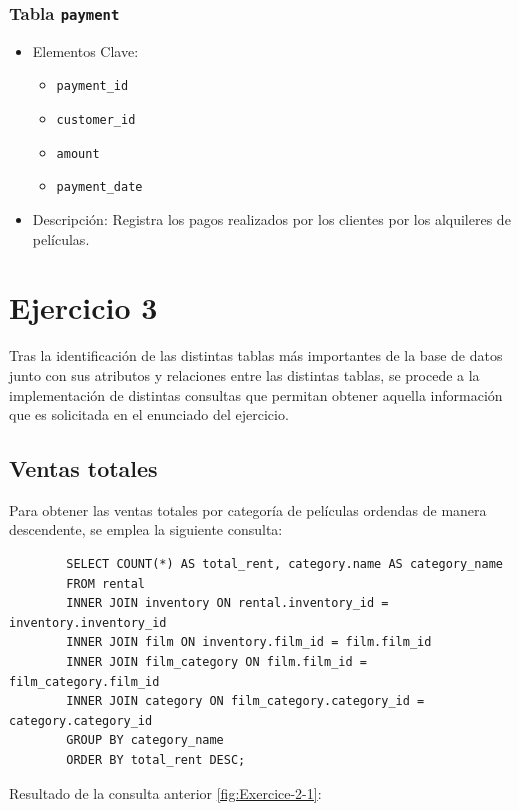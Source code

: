 \documentclass[11pt]{report}
\begin{document}
		\subsubsection{Tabla \texttt{payment}}
		\begin{itemize}
		  \item Elementos Clave:
		  \begin{itemize}
			\item \texttt{payment\_id}
			\item \texttt{customer\_id}
			\item \texttt{amount}
			\item \texttt{payment\_date}
		  \end{itemize}
		  \item Descripción: Registra los pagos realizados por los clientes por los alquileres de películas.
		\end{itemize}
	
	\section{Ejercicio 3}
	Tras la identificación de las distintas tablas más importantes de la base de datos junto con sus atributos  y relaciones entre las distintas tablas, se procede a la implementación de distintas consultas que permitan obtener aquella información que es solicitada en el enunciado del ejercicio.
\\
	\subsection{Ventas totales}
	Para obtener las ventas totales por categoría de películas ordendas de manera descendente, se emplea la siguiente consulta:

	\begin{verbatim}
		SELECT COUNT(*) AS total_rent, category.name AS category_name
		FROM rental
		INNER JOIN inventory ON rental.inventory_id = inventory.inventory_id
		INNER JOIN film ON inventory.film_id = film.film_id
		INNER JOIN film_category ON film.film_id = film_category.film_id
		INNER JOIN category ON film_category.category_id = category.category_id
		GROUP BY category_name
		ORDER BY total_rent DESC;
	\end{verbatim}

	Resultado de la consulta anterior \ref{fig:Exercice-2-1}:
\end{document}

